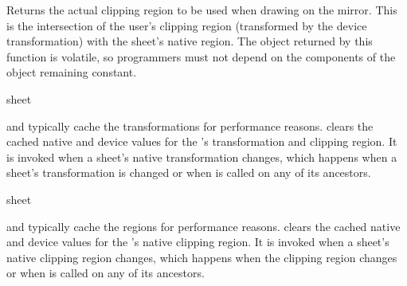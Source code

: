 Returns the actual clipping region to be used when drawing on the mirror.  This
is the intersection of the user's clipping region (transformed by the device
transformation) with the sheet's native region.  The object returned by this
function is volatile, so programmers must not depend on the components of the
object remaining constant.

 {sheet}

 and  typically
cache the transformations for performance reasons.
 clears the cached native and device
values for the  's transformation and clipping region.
It is invoked when a sheet's native transformation changes, which happens when a
sheet's transformation is changed or when 
is called on any of its ancestors.

 {sheet}

 and  typically cache the
regions for performance reasons.   clears the
cached native and device values for the  's native
clipping region.  It is invoked when a sheet's native clipping region changes,
which happens when the clipping region changes or when
 is called on any of its ancestors.

